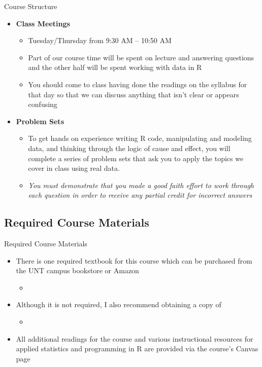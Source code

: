 \documentclass[12pt,ignorenonframetext,aspectratio=169]{beamer}
\begin{document}
\begin{frame}{Course Structure}
\begin{itemize}[<+->]
\item
  \textbf{Class Meetings}

  \begin{itemize}[<+->]
  \item
    Tuesday/Thursday from 9:30 AM -- 10:50 AM
  \item
    Part of our course time will be spent on lecture and answering
    questions and the other half will be spent working with data in R
  \item
    You should come to class having done the readings on the syllabus
    for that day so that we can discuss anything that isn't clear or
    appears confusing
  \end{itemize}
\item
  \textbf{Problem Sets}

  \begin{itemize}[<+->]
  \item
    To get hands on experience writing R code, manipulating and modeling
    data, and thinking through the logic of cause and effect, you will
    complete a series of problem sets that ask you to apply the topics
    we cover in class using real data.
  \item
    \emph{You must demonstrate that you made a good faith effort to work
    through each question in order to receive any partial credit for
    incorrect answers}
  \end{itemize}
\end{itemize}
\end{frame}

\hypertarget{required-course-materials}{%
\subsection{Required Course Materials}\label{required-course-materials}}

\begin{frame}{Required Course Materials}
\begin{itemize}[<+->]
\item
  There is one required textbook for this course which can be purchased
  from the UNT campus bookstore or Amazon

  \begin{itemize}[<+->]
  \item
  \end{itemize}
\item
  Although it is not required, I also recommend obtaining a copy of

  \begin{itemize}[<+->]
  \item
  \end{itemize}
\item
  All additional readings for the course and various instructional
  resources for applied statistics and programming in R are provided via
  the course's Canvas page
\end{itemize}
\end{frame}
\end{document}
